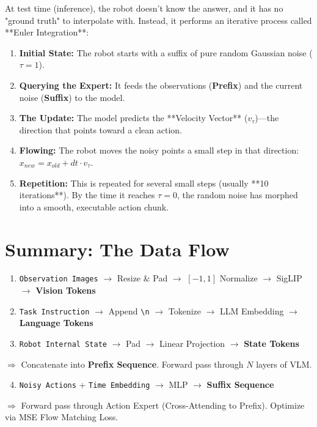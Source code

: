 \documentclass[11pt,a4paper]{article}
\begin{document}
At test time (inference), the robot doesn't know the answer, and it has no "ground truth" to interpolate with. Instead, it performs an iterative process called **Euler Integration**:
\begin{enumerate}
    \item \textbf{Initial State:} The robot starts with a suffix of pure random Gaussian noise ($\tau = 1$).
    \item \textbf{Querying the Expert:} It feeds the observations (\textbf{Prefix}) and the current noise (\textbf{Suffix}) to the model.
    \item \textbf{The Update:} The model predicts the **Velocity Vector** ($v_\tau$)—the direction that points toward a clean action.
    \item \textbf{Flowing:} The robot moves the noisy points a small step in that direction: $x_{new} = x_{old} + dt \cdot v_\tau$.
    \item \textbf{Repetition:} This is repeated for several small steps (usually **10 iterations**). By the time it reaches $\tau = 0$, the random noise has morphed into a smooth, executable action chunk.
\end{enumerate}

\section{Summary: The Data Flow}
\begin{enumerate}
    \item \verb|Observation Images| $\rightarrow$ Resize \& Pad $\rightarrow$ $[-1, 1]$ Normalize $\rightarrow$ SigLIP $\rightarrow$ \textbf{Vision Tokens}
    \item \verb|Task Instruction| $\rightarrow$ Append \verb|\n| $\rightarrow$ Tokenize $\rightarrow$ LLM Embedding $\rightarrow$ \textbf{Language Tokens}
    \item \verb|Robot Internal State| $\rightarrow$ Pad $\rightarrow$ Linear Projection $\rightarrow$ \textbf{State Tokens}
\end{enumerate}
\vspace{0.3cm}
$\Rightarrow$ Concatenate into \textbf{Prefix Sequence}. Forward pass through $N$ layers of VLM.
\vspace{0.3cm}
\begin{enumerate}
    \setcounter{enumi}{3}
    \item \verb|Noisy Actions| + \verb|Time Embedding| $\rightarrow$ MLP $\rightarrow$ \textbf{Suffix Sequence}
\end{enumerate}
$\Rightarrow$ Forward pass through Action Expert (Cross-Attending to Prefix). Optimize via MSE Flow Matching Loss.
\end{document}
